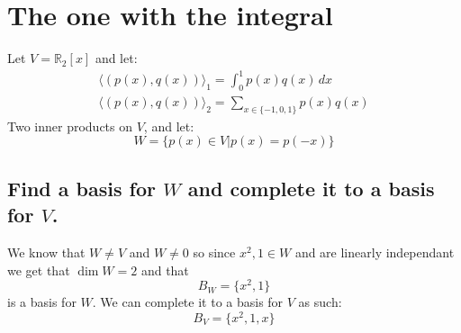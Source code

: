 \documentclass[11pt,a4paper]{article}
\theoremstyle{plain}
\newcommand{\R}{\mathbb{R}}
\begin{document}
	\newpage

	\section{The one with the integral}
	Let $V=\R_2[x]$ and let:
	\begin{align*}
		\langle(p(x),q(x))\rangle_1 = 
		\int_{0}^{1}{p(x)q(x)\,dx} \\
		\langle(p(x),q(x))\rangle_2 = 
		\sum_{x\in\{-1,0,1\}}{p(x)q(x)}
	\end{align*}
	Two inner products on $V$, and let:
	\[
		W = \{p(x)\in V \vert p(x) = p(-x)\}
	\]
	
	\subsection{Find a basis for $W$ and complete it to a basis for $V$.}
	We know that $W\neq V$ and $W\neq 0$ so since $x^2,1\in W$ and are linearly
	independant we get that $\dim W=2$ and that
	\[
		B_W = \{x^2, 1\}
	\]
	is a basis for $W$. We can complete it to a basis for $V$ as such:
	\[
		B_V = \{x^2, 1, x\}
	\]
	
	\newpage
\end{document}
